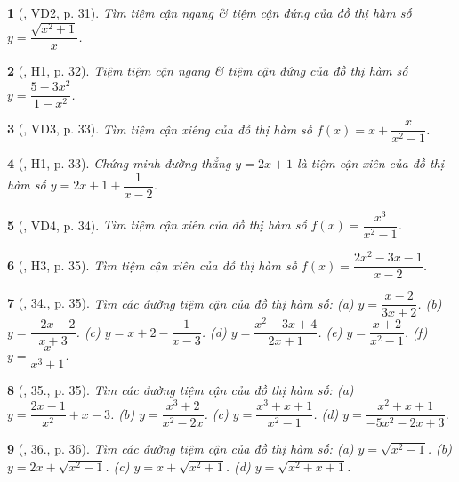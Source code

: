 \documentclass{article}
\newtheorem{baitoan}{}
\begin{document}
\begin{baitoan}[\cite{SGK_Toan_12_giai_tich_nang_cao}, VD2, p. 31]
	Tìm tiệm cận ngang \& tiệm cận đứng của đồ thị hàm số $y = \dfrac{\sqrt{x^2 + 1}}{x}$.
\end{baitoan}

\begin{baitoan}[\cite{SGK_Toan_12_giai_tich_nang_cao}, H1, p. 32]
	Tiệm tiệm cận ngang \& tiệm cận đứng của đồ thị hàm số $y = \dfrac{5 - 3x^2}{1 - x^2}$.
\end{baitoan}

\begin{baitoan}[\cite{SGK_Toan_12_giai_tich_nang_cao}, VD3, p. 33]
	Tìm tiệm cận xiêng của đồ thị hàm số $f(x) = x + \dfrac{x}{x^2 - 1}$.
\end{baitoan}

\begin{baitoan}[\cite{SGK_Toan_12_giai_tich_nang_cao}, H1, p. 33]
	Chứng minh đường thẳng $y = 2x + 1$ là tiệm cận xiên của đồ thị hàm số $y = 2x + 1 + \dfrac{1}{x - 2}$.
\end{baitoan}

\begin{baitoan}[\cite{SGK_Toan_12_giai_tich_nang_cao}, VD4, p. 34]
	Tìm tiệm cận xiên của đồ thị hàm số $f(x) = \dfrac{x^3}{x^2 - 1}$.
\end{baitoan}

\begin{baitoan}[\cite{SGK_Toan_12_giai_tich_nang_cao}, H3, p. 35]
	Tìm tiệm cận xiên của đồ thị hàm số $f(x) = \dfrac{2x^2 - 3x - 1}{x - 2}$.
\end{baitoan}

\begin{baitoan}[\cite{SGK_Toan_12_giai_tich_nang_cao}, 34., p. 35]
	Tìm các đường tiệm cận của đồ thị hàm số: (a) $y = \dfrac{x - 2}{3x + 2}$. (b) $y = \dfrac{-2x - 2}{x + 3}$. (c) $y = x + 2 - \dfrac{1}{x - 3}$. (d) $y = \dfrac{x^2 - 3x + 4}{2x + 1}$. (e) $y = \dfrac{x + 2}{x^2 - 1}$. (f) $y = \dfrac{x}{x^3 + 1}$.
\end{baitoan}

\begin{baitoan}[\cite{SGK_Toan_12_giai_tich_nang_cao}, 35., p. 35]
	Tìm các đường tiệm cận của đồ thị hàm số: (a) $y = \dfrac{2x - 1}{x^2} + x - 3$. (b) $y = \dfrac{x^3 + 2}{x^2 - 2x}$. (c) $y = \dfrac{x^3 + x + 1}{x^2 - 1}$. (d) $y = \dfrac{x^2 + x + 1}{-5x^2 - 2x + 3}$.
\end{baitoan}

\begin{baitoan}[\cite{SGK_Toan_12_giai_tich_nang_cao}, 36., p. 36]
	Tìm các đường tiệm cận của đồ thị hàm số: (a) $y = \sqrt{x^2 - 1}$. (b) $y = 2x + \sqrt{x^2 - 1}$. (c) $y = x + \sqrt{x^2 + 1}$. (d) $y = \sqrt{x^2 + x + 1}$.
\end{baitoan}
\end{document}
